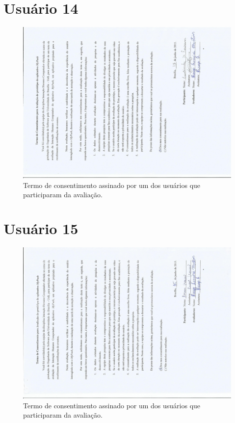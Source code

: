 \begin{anexosenv}
	
	 \section*{Usuário 14}
    \begin{figure}[!htbp]
      \centering
      \includegraphics[scale=0.6, angle=-90]{editaveis/figuras/ludimila}
      \caption{Termo de consentimento assinado por um dos usuários que participaram da avaliação.}
      \label{termo_consentimento_1}
    \end{figure}
    \pagebreak
	
	
	 \section*{Usuário 15}
    \begin{figure}[!htbp]
      \centering
      \includegraphics[scale=0.6, angle=-90]{editaveis/figuras/ruan}
      \caption{Termo de consentimento assinado por um dos usuários que participaram da avaliação.}
      \label{termo_consentimento_1}
    \end{figure}
    \pagebreak
    

\end{anexosenv}
